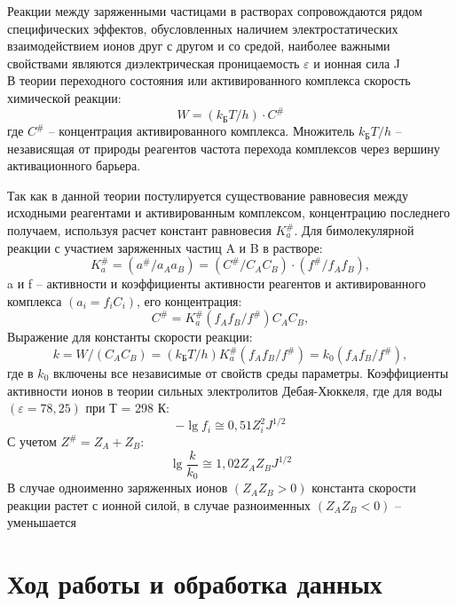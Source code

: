 \documentclass[a4paper,12pt]{article}
\begin{document}
Реакции между заряженными частицами в растворах сопровождаются рядом специфических эффектов, обусловленных наличием электростатических взаимодействием ионов друг с другом и со средой, наиболее важными свойствами являются диэлектрическая проницаемость $\varepsilon$ и ионная сила J\\
В теории переходного состояния или активированного комплекса скорость
химической реакции:
\begin{equation}
W = (k_{\text{Б}}T/h)\cdot C^{\#}
\end{equation}
где $C^{\#}$ -- концентрация активированного комплекса. Множитель $k_{\text{Б}}T/h$ -- независящая от природы реагентов частота перехода комплексов через вершину активационного барьера.

Так как в данной теории постулируется существование равновесия между
исходными реагентами и активированным комплексом, концентрацию последнего
получаем, используя расчет констант
равновесия $K_{a}^{\#}$. Для бимолекулярной реакции с участием заряженных частиц A и B в растворе:
\begin{equation}
K_{a}^{\#} = (a^{\#}/a_{A}a_{B}) = (C^{\#}/C_{A}C_{B})\cdot (f^{\#}/f_{A}f_{B}),
\end{equation}
a и f -- активности и коэффициенты активности реагентов
и активированного комплекса $(a_{i} = f_{i}C_{i})$, его концентрация:
\begin{equation}
C^{\#} = K_{a}^{\#}(f_{A}f_{B}/f^{\#})C_{A}C_{B},
\end{equation}
Выражение для константы скорости реакции:
\begin{equation}
k = W/(C_{A}C_{B}) = (k_{\text{Б}}T/h)K_{a}^{\#}(f_{A}f_{B}/f^{\#}) = k_{0}(f_{A}f_{B}/f^{\#}),
\end{equation}
где в $k_{0}$ включены все независимые от свойств среды параметры.
Коэффициенты активности ионов в теории сильных электролитов
Дебая-Хюккеля, где для воды $(\varepsilon = 78,25)$ при Т = 298 К:
\begin{equation}
-\lg f_{i} \cong 0,51 Z_{i}^{2}J^{1/2}
\end{equation}
С учетом $Z^{\#} = Z_{A} + Z_{B}$:
\begin{equation}
\lg \frac{k}{k_{0}} \cong 1,02 Z_{A}Z_{B}J^{1/2}
\end{equation}
В случае одноименно
заряженных ионов $(Z_{A}Z_{B} > 0)$ константа скорости реакции растет с ионной силой, в случае разноименных $(Z_{A}Z_{B} < 0)$ -- уменьшается
\section{Ход работы и обработка данных}
\end{document}

